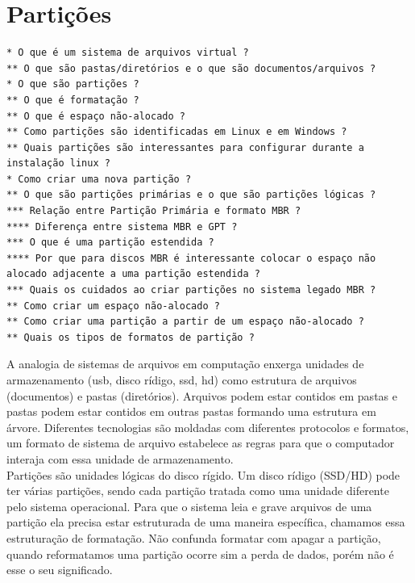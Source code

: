 \documentclass[12pt,a4paper]{article}
\begin{document}

\section{Partições}  


\begin{lstlisting}
* O que é um sistema de arquivos virtual ?
** O que são pastas/diretórios e o que são documentos/arquivos ?
* O que são partições ? 
** O que é formatação ? 
** O que é espaço não-alocado ?
** Como partições são identificadas em Linux e em Windows ?
** Quais partições são interessantes para configurar durante a instalação linux ? 
* Como criar uma nova partição ?
** O que são partições primárias e o que são partições lógicas ? 
*** Relação entre Partição Primária e formato MBR ?
**** Diferença entre sistema MBR e GPT ? 
*** O que é uma partição estendida ? 
**** Por que para discos MBR é interessante colocar o espaço não alocado adjacente a uma partição estendida ? 
*** Quais os cuidados ao criar partições no sistema legado MBR ?
** Como criar um espaço não-alocado ? 
** Como criar uma partição a partir de um espaço não-alocado ? 
** Quais os tipos de formatos de partição ? 
\end{lstlisting}

\vspace{\baselineskip}

A analogia de sistemas de arquivos em computação enxerga unidades de armazenamento (usb, disco rídigo, ssd, hd) como estrutura de arquivos (documentos) e pastas (diretórios). Arquivos podem estar contidos em pastas e pastas podem estar contidos em outras pastas formando uma estrutura em árvore. Diferentes tecnologias são moldadas com diferentes protocolos e formatos, um formato de sistema de arquivo estabelece as regras para que o computador interaja com essa unidade de armazenamento. \\

Partições são unidades lógicas do disco rígido. Um disco rídigo (SSD/HD) pode ter várias partições, sendo cada partição tratada como uma unidade diferente pelo sistema operacional. Para que o sistema leia e grave arquivos de uma partição ela precisa estar estruturada de uma maneira específica, chamamos essa estruturação de formatação. Não confunda formatar com apagar a partição, quando reformatamos uma partição ocorre sim a perda de dados, porém não é esse o seu significado. \\
\end{document}
